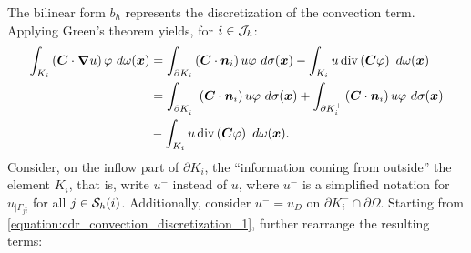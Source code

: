 The bilinear form $b_h$ represents the discretization of the convection term. Applying Green's theorem yields, for $i \in \mathcal{J}_h$:
\begin{align}
    \int_{K_i} \left( \bm{C} \cdot \bm{\nabla} u \right) \varphi ~ d \omega(\bm{x}) &= \int_{\partial K_i} \left( \bm{C} \cdot \bm{n}_i \right) u \varphi ~ d \sigma(\bm{x}) - \int_{K_i} u \operatorname*{div} \left( \bm{C} \varphi \right) ~ d \omega(\bm{x}) \notag \\
    &= \int_{\partial K_i^-} \left( \bm{C} \cdot \bm{n}_i \right) u \varphi ~ d \sigma(\bm{x}) + \int_{\partial K_i^+} \left( \bm{C} \cdot \bm{n}_i \right) u \varphi ~ d \sigma(\bm{x}) \label{equation:cdr_convection_discretization_1} \\
    & - \int_{K_i} u \operatorname*{div} \left( \bm{C} \varphi \right) ~ d \omega(\bm{x}). \notag
\end{align}
Consider, on the inflow part of $\partial K_i$, the ``information coming from outside'' the element $K_i$, that is, write $u^-$ instead of $u$, where $u^-$ is a simplified notation for $u_{\mid \Gamma_{ji}}$ for all $j \in \mathcal{S}_h(i)$. Additionally, consider $u^- = u_D$ on $\partial K_i^- \cap \partial \Omega$. Starting from \eqref{equation:cdr_convection_discretization_1}, further rearrange the resulting terms:
